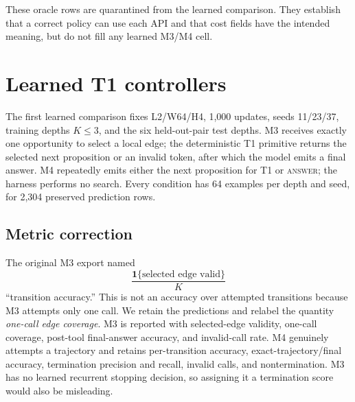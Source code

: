\documentclass[10pt]{article}
\begin{document}
These oracle rows are quarantined from the learned comparison. They establish that a correct policy can use each API and that cost fields have the intended meaning, but do not fill any learned M3/M4 cell.

\section{Learned T1 controllers}
The first learned comparison fixes L2/W64/H4, 1,000 updates, seeds 11/23/37, training depths $K\le3$, and the six held-out-pair test depths. M3 receives exactly one opportunity to select a local edge; the deterministic T1 primitive returns the selected next proposition or an invalid token, after which the model emits a final answer. M4 repeatedly emits either the next proposition for T1 or \textsc{answer}; the harness performs no search. Every condition has 64 examples per depth and seed, for 2,304 preserved prediction rows.

\subsection{Metric correction}
The original M3 export named
\[
\frac{\mathbf 1\{\text{selected edge valid}\}}{K}
\]
``transition accuracy.'' This is not an accuracy over attempted transitions because M3 attempts only one call. We retain the predictions and relabel the quantity \emph{one-call edge coverage}. M3 is reported with selected-edge validity, one-call coverage, post-tool final-answer accuracy, and invalid-call rate. M4 genuinely attempts a trajectory and retains per-transition accuracy, exact-trajectory/final accuracy, termination precision and recall, invalid calls, and nontermination. M3 has no learned recurrent stopping decision, so assigning it a termination score would also be misleading.
\end{document}
